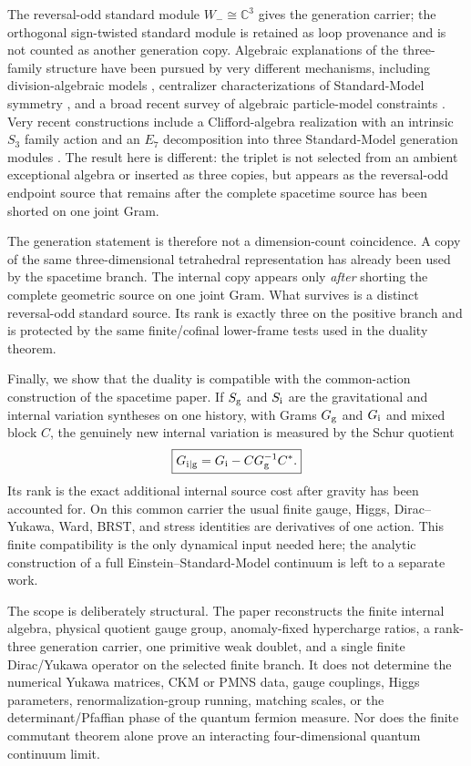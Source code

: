 \documentclass[11pt]{article}
\theoremstyle{definition}
\theoremstyle{remark}
\newcommand{\C}{\mathbb C}
\begin{document}
The reversal-odd standard module $W_-\cong\C^3$ gives the generation carrier;
the orthogonal sign-twisted standard module is retained as loop provenance and
is not counted as another generation copy.  Algebraic explanations of the
three-family structure have been pursued by very different mechanisms,
including division-algebraic models \cite{Furey2018}, centralizer
characterizations of Standard-Model symmetry \cite{Krasnov2021}, and a broad
recent survey of algebraic particle-model constraints \cite{FureyRoadmap2025}.
Very recent constructions include a Clifford-algebra realization with an
intrinsic $S_3$ family action \cite{Gresnigt2026} and an $E_7$ decomposition
into three Standard-Model generation modules \cite{Baez2026}.  The result here is different: the triplet is not selected
from an ambient exceptional algebra or inserted as three copies, but appears
as the reversal-odd endpoint source that remains after the complete spacetime
source has been shorted on one joint Gram.

The generation statement is therefore not a dimension-count coincidence.  A
copy of the same three-dimensional tetrahedral representation has already been
used by the spacetime branch.  The internal copy appears only \emph{after}
shorting the complete geometric source on one joint Gram.  What survives is a
distinct reversal-odd standard source.  Its rank is exactly three on the
positive branch and is protected by the same finite/cofinal lower-frame tests
used in the duality theorem.

Finally, we show that the duality is compatible with the common-action
construction of the spacetime paper.  If $S_{\rm g}$ and $S_{\rm i}$ are the
gravitational and internal variation syntheses on one history, with Grams
$G_{\rm g}$ and $G_{\rm i}$ and mixed block $C$, the genuinely new internal
variation is measured by the Schur quotient
\begin{equation}
\boxed{
G_{{\rm i}\mid{\rm g}}
=
G_{\rm i}-CG_{\rm g}^{-1}C^*.}
\label{eq:intro-schur}
\end{equation}
Its rank is the exact additional internal source cost after gravity has been
accounted for.  On this common carrier the usual finite gauge, Higgs,
Dirac--Yukawa, Ward, BRST, and stress identities are derivatives of one
action.  This finite compatibility is the only dynamical input needed here;
the analytic construction of a full Einstein--Standard-Model continuum is left
to a separate work.

The scope is deliberately structural.  The paper reconstructs the finite
internal algebra, physical quotient gauge group, anomaly-fixed hypercharge
ratios, a rank-three generation carrier, one primitive weak doublet, and a
single finite Dirac/Yukawa operator on the selected finite branch.  It
does not determine the numerical Yukawa matrices, CKM or PMNS data, gauge
couplings, Higgs parameters, renormalization-group running, matching scales,
or the determinant/Pfaffian phase of the quantum fermion measure.  Nor does the
finite commutant theorem alone prove an interacting four-dimensional quantum
continuum limit.
\end{document}
